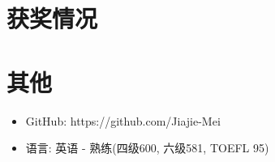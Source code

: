 \documentclass{resume}
\begin{document}
\section{获奖情况}

\section{其他}
\begin{itemize}[parsep=0.5ex]
  \item GitHub: https://github.com/Jiajie-Mei
  \item 语言: 英语 - 熟练(四级600, 六级581, TOEFL 95)
\end{itemize}

%
%
\end{document}
